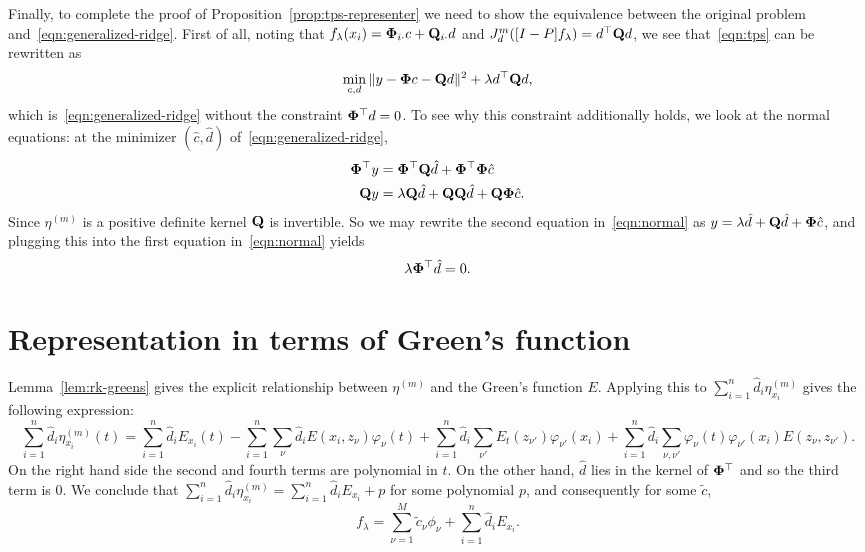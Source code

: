 \documentclass{article}
\newcommand{\wt}[1]{\widetilde{#1}}
\newcommand{\1}{\mathbf{1}}
\begin{document}
Finally, to complete the proof of Proposition~\ref{prop:tps-representer} we need to show the equivalence between the original problem and~\eqref{eqn:generalized-ridge}. First of all, noting that $f_{\lambda}(x_i) = {\bf \Phi}_{i\cdot} c + {\bf Q}_{i \cdot} d$ and $J_d^{m}([I - P]f_{\lambda}) = d^{\top} {\bf Q} d$,  we see that~\eqref{eqn:tps} can be rewritten as 
\begin{equation*}
\min_{c,d} \|y - {\bf \Phi} c - {\bf Q} d\|^2 + \lambda d^{\top} {\bf Q} d,
\end{equation*}
which is~\eqref{eqn:generalized-ridge} without the constraint ${\bf \Phi}^{\top}d = 0$. To see why this constraint additionally holds, we look at the normal equations: at the minimizer $(\hat{c},\hat{d})$ of~\eqref{eqn:generalized-ridge},
\begin{equation}
\label{eqn:normal}
\begin{aligned}
{\bf \Phi}^{\top} y &=  {\bf \Phi}^{\top} {\bf Q} \hat{d} + {\bf \Phi}^{\top} {\bf \Phi} \hat{c} \\
{\bf Q} y & = \lambda {\bf Q} \hat{d}  + {\bf Q}{\bf Q} \hat{d} + {\bf Q} {\bf \Phi} \hat{c}.
\end{aligned}
\end{equation}
Since $\eta^{(m)}$ is a positive definite kernel ${\bf Q}$ is invertible. So we may rewrite the second equation in~\eqref{eqn:normal} as $y = \lambda \hat{d} + {\bf Q} \hat{d} + {\bf \Phi} \hat{c}$, and plugging this into the first equation in~\eqref{eqn:normal} yields
\begin{equation*}
\lambda {\bf \Phi}^{\top} \hat{d} = 0.
\end{equation*}

\section{Representation in terms of Green's function}
Lemma~\ref{lem:rk-greens} gives the explicit relationship between $\eta^{(m)}$ and the Green's function $E$. Applying this to $\sum_{i = 1}^{n} \hat{d}_i \eta_{x_i}^{(m)}$ gives the following expression:
\begin{equation*}
\sum_{i = 1}^{n} \hat{d}_i \eta_{x_i}^{(m)}(t) = \sum_{i = 1}^{n} \hat{d}_i E_{x_i}(t) - \sum_{i = 1}^{n} \sum_{\nu} \hat{d}_i E(x_i,z_{\nu}) \varphi_{\nu}(t) + \sum_{i = 1}^{n} \hat{d}_i \sum_{\nu'} E_{t}(z_{\nu'}) \varphi_{\nu'}(x_i) + \sum_{i = 1}^{n} \hat{d}_i \sum_{\nu,\nu'} \varphi_{\nu}(t) \varphi_{\nu'}(x_i) E(z_{\nu},z_{\nu'}).
\end{equation*}
On the right hand side the second and fourth terms are polynomial in $t$. On the other hand, $\hat{d}$ lies in the kernel of ${\bf \Phi}^{\top}$ and so the third term is $0$. We conclude that $\sum_{i = 1}^{n} \hat{d}_i \eta_{x_i}^{(m)} = \sum_{i = 1}^{n} \hat{d}_i E_{x_i} + p$ for some polynomial $p$, and consequently for some $\wt{c}$,
\begin{equation}
\label{pf:thm1-1}
f_{\lambda} = \sum_{\nu = 1}^{M} \tilde{c}_{\nu} \phi_{\nu} + \sum_{i = 1}^{n} \hat{d}_i E_{x_i}.
\end{equation}
\end{document}
